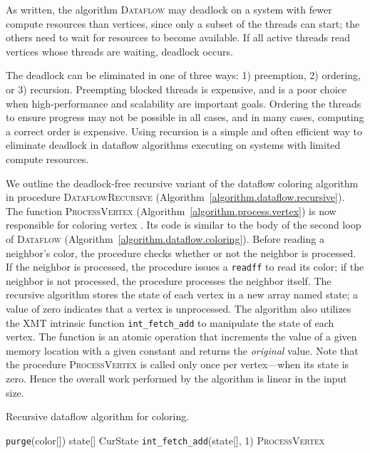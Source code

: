 \documentclass{article}
\begin{document}
As written, the algorithm \textsc{Dataflow} may deadlock on a system with fewer compute resources
than vertices, since only a subset of the threads can start; the others need to wait for resources to
become available. If all active threads read vertices whose threads are waiting, deadlock occurs.

The deadlock can be eliminated in one of three ways: 1) preemption, 2) ordering, or 3) recursion.
Preempting blocked threads is expensive, and is a poor choice when 
high-performance and scalability are important goals.
Ordering the threads to ensure progress may not be possible in all cases, 
and in many cases, computing a correct order is expensive.
Using recursion is a simple and often efficient way to eliminate deadlock in dataflow algorithms 
executing on systems with limited compute resources.

We outline the deadlock-free recursive variant of the dataflow coloring
algorithm in procedure \textsc{DataflowRecursive} (Algorithm~\ref{algorithm.dataflow.recursive}).
The function \textsc{ProcessVertex} (Algorithm~\ref{algorithm.process.vertex}) 
is now responsible for coloring vertex .
Its code is similar to the body of the second loop of
\textsc{Dataflow} (Algorithm~\ref{algorithm.dataflow.coloring}).
Before reading a neighbor's color, the procedure checks whether or not the neighbor is processed.
If the neighbor is processed, the procedure issues a \texttt{readff} to read its color; if the neighbor
is not processed, the procedure processes the neighbor itself.
The recursive algorithm stores the state of each vertex in a new array named \textsf{state}; a value of
zero indicates that a vertex is unprocessed. 
The algorithm also utilizes the XMT intrinsic function \texttt{int\_fetch\_add} to manipulate
the state of each vertex.
The function is an atomic operation that increments the value of a given memory location 
with a given constant and returns the {\em original} value.  
Note that the procedure \textsc{ProcessVertex} is called only once per vertex---when its 
state is zero. Hence the overall work performed by the algorithm is linear in the input size. 

\begin{algorithm}[t]
\small
\caption{Recursive dataflow algorithm for coloring.}
\label{algorithm.dataflow.recursive}
\begin{algorithmic}[1]
      \State \texttt{purge}(\textsf{color}[]) 
      \State \textsf{state}[]
  \EndFor
      \State CurState  \texttt{int\_fetch\_add}(\textsf{state}[], 1) 
           \State \textsc{ProcessVertex}
       \EndIf
  \EndFor
\EndProcedure
\end{algorithmic}
\end{algorithm}
\end{document}
